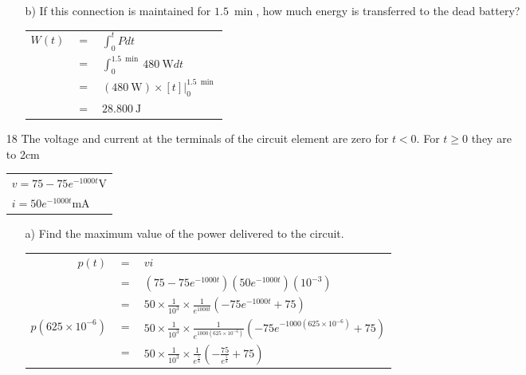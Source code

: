 \documentclass[a4paper]{article}
\newcommand\tab[1][0.5cm]{\hspace*{#1}}
\begin{document}
\begin{itemize}
\begin{itemize}
\begin{tabular}{r c l}
	      	      \end{tabular} 
	      	\item[b)] If this connection is maintained for $\SI{1.5}{\min}$, how much energy is transferred to the dead battery? \\
	      	      \begin{tabular}{r c l}
	      	      	$W(t)$ & $=$ & $\int_{0}^{t} Pdt$                                 \\
	      	      	       & $=$ & $\int_{0}^{\SI{1.5}{\min}} \SI{480}{\watt}dt$      \\
	      	      	       & $=$ & $(\SI{480}{\watt})\times[t]|_{0}^{\SI{1.5}{\min}}$ \\
	      	      	       & $=$ & $\SI{28,800}{\joule}$                              \\
	      	      \end{tabular}
	      \end{itemize}
	\item[18] The voltage and current at the terminals of the circuit element are zero for $t < 0$. For $t \geq 0$ they are \\
	      \hbox to 2cm{}
	      \tab\begin{tabular}{l}
	      $v = 75 - 75e^{-1000t}\si{\volt}$ \\
	      $i = 50e^{-1000t}\si{\milli\ampere}$
	\end{tabular}
	\begin{itemize}
		\item[a)] Find the maximum value of the power delivered to the circuit. \\
		      \begin{tabular}{r c l}
		      	$p(t)$                & $=$ & $vi$                                                                                                    \\
		      	                      & $=$ & $(75 - 75e^{-1000t})(50e^{-1000t})(10^{-3})$                                                            \\
		      	                      & $=$ & $50\times\frac{1}{10^3}\times\frac{1}{e^{1000t}}(-75e^{-1000t} + 75)$                                   \\
		      	$p(625\times10^{-6})$ & $=$ & $50\times\frac{1}{10^3}\times\frac{1}{e^{1000(625\times10^{-6})}}(-75e^{-1000(625\times10^{-6})} + 75)$ \\
		      	                      & $=$ & $50\times\frac{1}{10^3}\times\frac{1}{e^{\frac{5}{8}}}(-\frac{75}{e^{\frac{5}{8}}} + 75)$               \\

\end{tabular}
\end{itemize}
\end{itemize}
\end{document}
